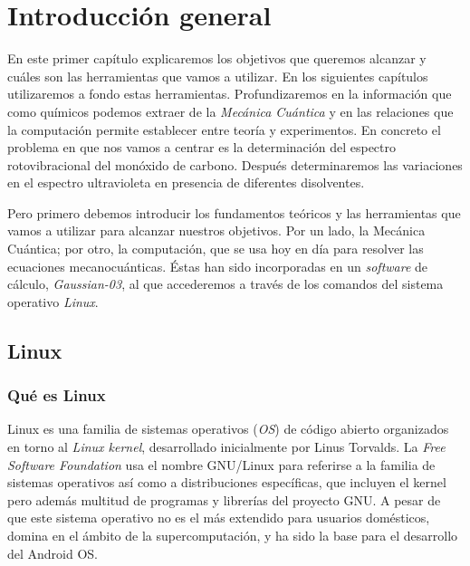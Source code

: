 \documentclass{tufte-book}
\begin{document}



\chapter[introduccion]{Introducción general}
En este primer capítulo explicaremos los objetivos que queremos
alcanzar y cuáles son las herramientas que vamos a utilizar. En 
los siguientes capítulos utilizaremos a fondo estas herramientas.
Profundizaremos en la información que como químicos podemos extraer
de la \textit{Mecánica Cuántica} y en las relaciones que la computación 
permite establecer entre teoría y experimentos. En concreto el
problema en que nos vamos a centrar es la determinación del espectro
rotovibracional del monóxido de carbono. Después determinaremos
las variaciones en el espectro ultravioleta en presencia de 
diferentes disolventes.

Pero primero debemos introducir los fundamentos teóricos
y las herramientas que vamos a utilizar para alcanzar nuestros 
objetivos. Por un lado, la Mecánica Cuántica; por otro, 
la computación, que se usa hoy en día para resolver las ecuaciones 
mecanocuánticas. Éstas han sido incorporadas en un \textit{software}
de cálculo, \textit{Gaussian-03}, al que accederemos a través de 
los comandos del sistema operativo \textit{Linux}.

\section{Linux}
\subsection{Qué es Linux}
Linux es una familia de sistemas operativos (\textit{OS}) de código 
abierto organizados en torno al \textit{Linux kernel}, desarrollado
inicialmente por Linus Torvalds. La \textit{Free Software Foundation} 
usa el nombre GNU/Linux para referirse a la familia de sistemas 
operativos así como a distribuciones específicas, que incluyen el 
kernel pero además multitud de programas y librerías del proyecto
GNU. A pesar de que este sistema operativo no es el más extendido
para usuarios domésticos, domina en el ámbito de la supercomputación,
y ha sido la base para el desarrollo del Android OS.
\end{document}
